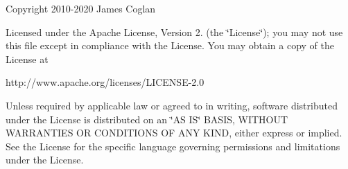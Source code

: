 Copyright 2010-\/2020 James Coglan

Licensed under the Apache License, Version 2. (the \char`\"{}\+License\char`\"{}); you may not use this file except in compliance with the License. You may obtain a copy of the License at \begin{DoxyVerb}http://www.apache.org/licenses/LICENSE-2.0
\end{DoxyVerb}
 Unless required by applicable law or agreed to in writing, software distributed under the License is distributed on an \char`\"{}\+AS IS\char`\"{} BASIS, WITHOUT WARRANTIES OR CONDITIONS OF ANY KIND, either express or implied. See the License for the specific language governing permissions and limitations under the License. 